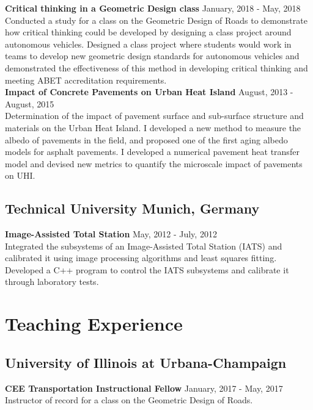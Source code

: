 \documentclass[12pt]{article}
\begin{document}
\textbf{Critical thinking in a Geometric Design class} \hfill January, 2018 - May, 2018\\
Conducted a study for a class on the Geometric Design of Roads to demonstrate how critical thinking could be developed by designing a class project around autonomous vehicles. Designed a class project where students would work in teams to develop new geometric design standards for autonomous vehicles and demonstrated the effectiveness of this method in developing critical thinking and meeting ABET accreditation requirements. \\

\textbf{Impact of Concrete Pavements on Urban Heat Island} \hfill August, 2013 - August, 2015 \\
Determination of the impact of pavement surface and sub-surface structure and materials on the Urban Heat Island. I developed a new method to measure the albedo of pavements in the field, and proposed one of the first aging albedo models for asphalt pavements. I developed a numerical pavement heat transfer model and devised new metrics to quantify the microscale impact of pavements on UHI. \\

\subsection*{Technical University Munich, Germany}
\textbf{Image-Assisted Total Station} \hfill May, 2012 - July, 2012 \\
Integrated the subsystems of an Image-Assisted Total Station (IATS) and calibrated it using image processing algorithms and least squares fitting. Developed a C++ program to control the IATS subsystems and calibrate it through laboratory tests. \\

\section*{Teaching Experience}
\subsection*{University of Illinois at Urbana-Champaign}
\textbf{CEE Transportation Instructional Fellow} \hfill January, 2017 - May, 2017 \\
Instructor of record for a class on the Geometric Design of Roads.\\
\end{document}
